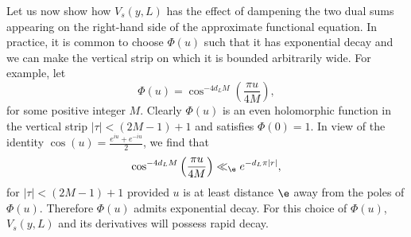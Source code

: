 \documentclass[12pt]{article}
\begin{document}
      Let us now show how \(V_{s}(y,L)\) has the effect of dampening the two dual sums appearing on the right-hand side of the approximate functional equation. In practice, it is common to choose \(\Phi(u)\) such that it has exponential decay and we can make the vertical strip on which it is bounded arbitrarily wide. For example, let
      \[
        \Phi(u) = \cos^{-4d_{L}M}\left(\frac{\pi u}{4M}\right),
      \]
      for some positive integer \(M\). Clearly \(\Phi(u)\) is an even holomorphic function in the vertical strip \(|\tau| < (2M-1)+1\) and satisfies \(\Phi(0) = 1\). In view of the identity \(\cos(u) = \frac{e^{iu}+e^{-iu}}{2}\), we find that
      \begin{equation}\label{equ:choice_for_V_decay_estimate}
      \cos^{-4d_{L}M}\left(\frac{\pi u}{4M}\right) \ll_{\e} e^{-d_{L}\pi|r|},
      \end{equation}
      for \(|\tau| < (2M-1)+1\) provided \(u\) is at least distance \(\e\) away from the poles of \(\Phi(u)\). Therefore \(\Phi(u)\) admits exponential decay. For this choice of \(\Phi(u)\), \(V_{s}(y,L)\) and its derivatives will possess rapid decay.
\end{document}
